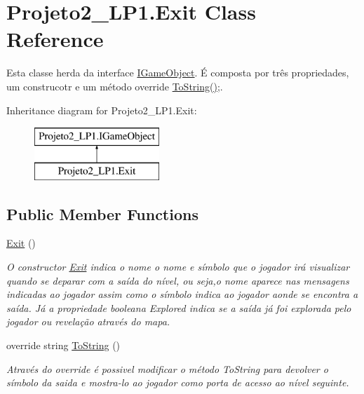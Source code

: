 \hypertarget{class_projeto2___l_p1_1_1_exit}{}\section{Projeto2\+\_\+\+L\+P1.\+Exit Class Reference}
\label{class_projeto2___l_p1_1_1_exit}


Esta classe herda da interface \mbox{\hyperlink{interface_projeto2___l_p1_1_1_i_game_object}{I\+Game\+Object}}. É composta por três propriedades, um construcotr e um método override \mbox{\hyperlink{class_projeto2___l_p1_1_1_exit_a45f6b4cb0db046f8b31859370aff2f92}{To\+String()}};.  


Inheritance diagram for Projeto2\+\_\+\+L\+P1.\+Exit\+:\begin{figure}[H]
\begin{center}
\leavevmode
\includegraphics[height=2.000000cm]{class_projeto2___l_p1_1_1_exit}
\end{center}
\end{figure}
\subsection*{Public Member Functions}
\begin{DoxyCompactItemize}
\item 
\mbox{\hyperlink{class_projeto2___l_p1_1_1_exit_a0349c71f77345fcc751db7c4c9156fe5}{Exit}} ()
\begin{DoxyCompactList}\small\item\em O constructor \mbox{\hyperlink{class_projeto2___l_p1_1_1_exit}{Exit}} indica o nome o nome e símbolo que o jogador irá visualizar quando se deparar com a saída do nível, ou seja,o nome aparece nas mensagens indicadas ao jogador assim como o símbolo indica ao jogador aonde se encontra a saída. Já a propriedade booleana Explored indica se a saída já foi explorada pelo jogador ou revelação através do mapa. \end{DoxyCompactList}\item 
override string \mbox{\hyperlink{class_projeto2___l_p1_1_1_exit_a45f6b4cb0db046f8b31859370aff2f92}{To\+String}} ()
\begin{DoxyCompactList}\small\item\em Através do override é possivel modificar o método To\+String para devolver o símbolo da saida e mostra-\/lo ao jogador como porta de acesso ao nível seguinte. \end{DoxyCompactList}\end{DoxyCompactItemize}
